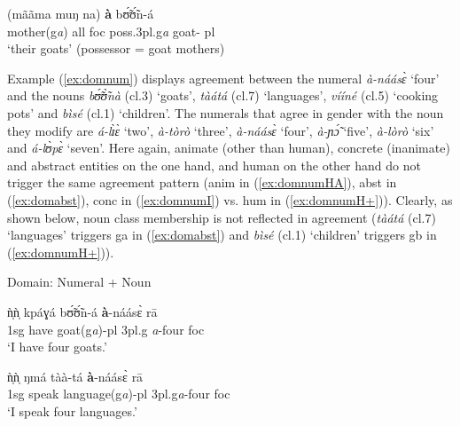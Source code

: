 \begin{exe}
\begin{exe}
\begin{exe}
{\begin{exe}
\begin{exe}
\begin{exe}
\begin{exe}
\begin{exe}
\begin{exe}
\begin{exe}
\begin{xlist}
\begin{exe}
\begin{exe}
\begin{exe}
\begin{exe}
\begin{exe}
\begin{exe}
\begin{exe}
\begin{exe}
\begin{exe}
\begin{exe}
\begin{exe}
\begin{exe}
\begin{exe}
\ex\label{ex:dompossH-}

\gll (mããma muŋ na)   \textbf{à}   bʊ̃́ʊ̃́n-á   \\
      mother({\sc g}{\it a}) all {\sc foc}  {\sc poss.3pl.g}{\it a} {goat-{\sc
pl}} \\
\glt `their goats' (possessor = goat mothers) 





\z 
 \z
 

Example (\ref{ex:domnum}) displays agreement between the numeral
{\it à-náásɛ̀} `four' and the nouns  {\it bʊ̃́ʊ̃̀nà}
({\sc cl.3}) `goats',  {\it tàátá} ({\sc cl.7})
`languages',  {\it vííné} ({\sc cl.5}) `cooking
pots' and  {\it bìsé} ({\sc cl.1}) `children'. The  numerals that agree
in gender with the noun they
modify are  {\it á-lɪ̀ɛ̀} `two',
 {\it à-tòrò} `three',  {\it à-náásɛ̀}
`four',  {\it à-ɲɔ̃́} `five',
 {\it à-lòrò} `six' and  {\it á-lʊ̀pɛ̀}
`seven'. Here again, animate (other than human), concrete (inanimate) and
abstract entities on the one hand, and human on the other hand do not
trigger the same agreement pattern ({\sc anim} in (\ref{ex:domnumHA}),
 {\sc abst} in  (\ref{ex:domabst}),   {\sc conc} in (\ref{ex:domnumI})  vs. 
{\sc hum} in  (\ref{ex:domnumH+})). Clearly, as shown below, noun
class membership is not reflected in agreement ({\it tàátá} ({\sc cl.7})
`languages' triggers {\sc g}a in (\ref{ex:domabst}) and 
 {\it bìsé} ({\sc cl.1}) `children' triggers {\sc g}b in (\ref{ex:domnumH+})).


\ea\label{ex:domnum}{\rm Domain: Numeral + Noun}\\


\ea\label{ex:domnumHA}

\gll  ǹ̩ǹ̩  kpáɣá  bʊ̃́ʊ̃́n-á  \textbf{à}-náásɛ̀ rā  \\
       {\sc 1sg}  {have}  {goat({\sc g}{\it a})-{\sc pl}}  {{\sc 3pl.g}{\it
a}-four} {\sc foc} \\
\glt `I have four goats.' \\

\ex\label{ex:domabst}

\gll   ǹ̩ǹ̩  ŋmá  tàà-tá \textbf{à}-náásɛ̀ rā  \\
        {\sc 1sg}  {speak}  {language({\sc g}{\it a})-{\sc pl}}   {{\sc
3pl.g}{\it a}-four} {\sc foc} \\
\glt `I speak four languages.' \\




\end{exe}
\end{exe}
\end{exe}
\end{exe}
\end{exe}
\end{exe}
\end{exe}
\end{exe}
\end{exe}
\end{exe}
\end{exe}
\end{exe}
\end{exe}
\end{xlist}
\end{exe}
\end{exe}
\end{exe}
\end{exe}
\end{exe}
\end{exe}
\end{exe}}
\end{exe}
\end{exe}
\end{exe}
